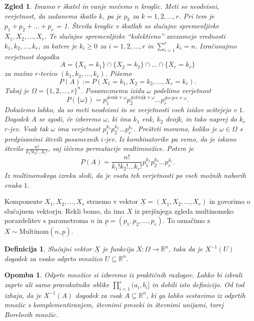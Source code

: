 \documentclass[10pt, a4paper]{article}
\newtheorem{defi}[izr]{Definicija}
\newenvironment{noticeB}{%
  \tcolorbox[%
  notitle,
  empty,
  enhanced,  %
  breakable,
  coltext=black,
  colback=white, 
  fontupper=\rmfamily,
  parbox=false,
  noparskip,
  sharp corners,
  boxrule=-1pt,  %
  frame hidden,
  left=7pt,  %
  right=7pt,
  top=5pt,
  bottom=5pt,
  before skip=2.5ex plus 2pt,
  after skip=2.5ex plus 2pt,
  borderline west = {1.5pt}{-0.1pt}{blue!30!black}, %
  overlay unbroken and last={%
    \draw[color=black, line width=1.25pt]
    ($(frame.south west)+(1.pt, -0.1pt)$) -- ++(2em, 0);
  }
  ]}
{\endtcolorbox}
\newenvironment{definicija}{\begin{defi}\begin{noticeB}}{%
    \end{noticeB}\end{defi}}
\newtheorem*{opomba}{Opomba}
\newtheorem{zgled}[izr]{Zgled}
\newcommand{\R}{\mathbb {R}}
\begin{document}
\begin{zgled}
  Imamo $r$ škatel in vanje mečemo $n$ kroglic.
  Meti so neodvisni, verjetnost, da zadanemo škatlo $k$,
  pa je $p_k$ za $k = 1, 2, \dots, r$.
  Pri tem je $p_1 + p_2 + \dots + p_r$ = 1.
  Števila kroglic v škatlah so slučajne spremenljivke $X_1, X_2, \dots, X_r$.
  Te slučajne spremenljivke "`kolektivno"' zavzamejo vrednosti $k_1, k_2, \dots, k_r$,
  za katere je $k_i \geq 0$ za $i = 1, 2, \dots, r$ in $\sum_{i = 1}^r k_i = n.$
  Izračunajmo verjetnost dogodka 
  $$A = \{X_1 = k_1\} \cap \{X_2 = k_2\} \cap \dots \cap \{X_r = k_r\}$$
  za možno $r$-terico $(k_1, k_2, \dots, k_r)$.
  Pišemo 
  $$P(A) := P(X_1 = k_1, X_2 = k_2, \dots, X_r = k_r).$$
  Tukaj je $\Omega = \{1, 2, \dots, r\}^n$.
  Posameznemu izidu $\omega$ podelimo verjetnost
  $$P(\{\omega\}) = p_1^{\text{\# enk v $\omega$}} p_2^{\text{\# dvojk v $\omega$}} \dots p_r^{\text{\# $r$-jev v $\omega$}}.$$
  Dokažemo lahko, da so meti neodvisni in se verjetnosti vseh izidov seštejejo v $1$.
  Dogodek $A$ se zgodi, če izberemo $\omega$, ki ima 
  $k_1$ enk, $k_2$ dvojk, in tako naprej do $k_r$ $r$-jev.
  Vsak tak $\omega$ ima verjetnost $p_1^{k_1} p_2^{k_2} \dots p_r^{k_r}$.
  Prešteti moramo, koliko je $\omega \in \Omega$ s predpisanimi števili posameznih $i$-jev.
  Iz kombinatorike pa vemo, da je iskano število
  $\frac{n!}{k_1! k_2! \dots k_r!}$, saj iščemo permutacije multimnožice.
  Potem je $$P(A) = \frac{n!}{k_1! k_2! \dots k_r!} p_1^{k_1} p_2^{k_2} \dots p_r^{k_r}.$$
  Iz multinomskega izreka sledi, da je vsota teh verjetnosti po vseh možnih naborih enaka $1$. 
\end{zgled}

Komponente $X_1, X_2, \dots, X_r$ strnemo v vektor $\underline{X} = (X_1, X_2, \dots, X_r)$
in govorimo o slučajnem vektorju.
Rekli bomo, da ima $X$ iz prejšnjega zgleda multinomsko porazdelitev s parametroma $n$ in $\underline{p} = (p_1, p_2, \dots, p_r)$.
To označimo z $X \sim \mathrm{Multinom} (n, \underline{p})$.

\begin{definicija}
  Slučajni vektor $\underline{X}$ je funkcija $X: \Omega \to \R^n$,
  taka da je $X^{-1} (U)$ dogodek za vsako odprto množico $U\subseteq \R^n$.
\end{definicija}

\begin{opomba}
  Odprte množice si izberemo iz praktičnih razlogov.
  Lahko bi izbrali zaprte ali samo pravokotnike oblike $\prod_{i = 1} ^r (a_i, b_i]$
  in dobili isto definicijo. Od tod izhaja, da je $X^{-1} (A)$ dogodek za vsak $A \subseteq \R^n$,
  ki ga lahko sestavimo iz odprtih množic s komplementiranjem, števnimi preseki in števnimi unijami,
  torej Borelovih množic.
\end{opomba}
\end{document}
